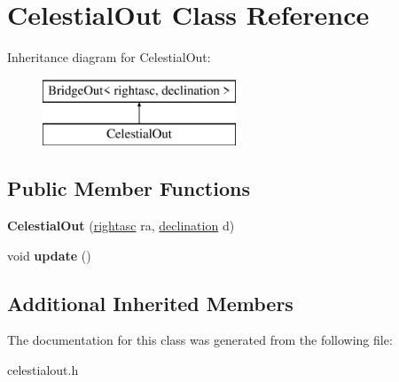 \hypertarget{classCelestialOut}{}\section{Celestial\+Out Class Reference}
\label{classCelestialOut}
Inheritance diagram for Celestial\+Out\+:\begin{figure}[H]
\begin{center}
\leavevmode
\includegraphics[height=2.000000cm]{classCelestialOut}
\end{center}
\end{figure}
\subsection*{Public Member Functions}
\begin{DoxyCompactItemize}
\item 
\mbox{\label{classCelestialOut_a101fb3189ec42ef4f910db568b3e56a3}} 
{\bfseries Celestial\+Out} (\mbox{\hyperlink{structrightasc}{rightasc}} ra, \mbox{\hyperlink{structdeclination}{declination}} d)
\item 
\mbox{\label{classCelestialOut_a47e713727665da513c6972da7657ccf2}} 
void {\bfseries update} ()
\end{DoxyCompactItemize}
\subsection*{Additional Inherited Members}


The documentation for this class was generated from the following file\+:\begin{DoxyCompactItemize}
\item 
celestialout.\+h\end{DoxyCompactItemize}

